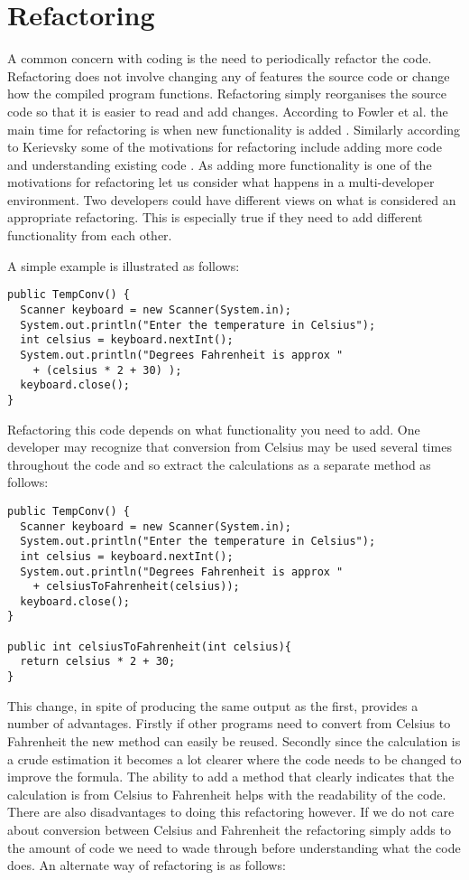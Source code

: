 \section{Refactoring}

A common concern with coding is the need to periodically refactor the code. Refactoring does not involve changing any of features the source code or change how the compiled program functions. Refactoring simply reorganises the source code so that it is easier to read and add changes. According to Fowler et al. the main time for refactoring is when new functionality is added \cite{Fowler1999}. Similarly according to Kerievsky some of the motivations for refactoring include adding more code and understanding existing code \cite{Kerievsky2004}. As adding more functionality is one of the motivations for refactoring let us consider what happens in a multi-developer environment. Two developers could have different views on what is considered an appropriate refactoring. This is especially true if they need to add different functionality from each other. 

A simple example is illustrated as follows:

\begin{lstlisting}
public TempConv() {
  Scanner keyboard = new Scanner(System.in);
  System.out.println("Enter the temperature in Celsius");
  int celsius = keyboard.nextInt();
  System.out.println("Degrees Fahrenheit is approx " 
    + (celsius * 2 + 30) );
  keyboard.close();
}
\end{lstlisting}

Refactoring this code depends on what functionality you need to add. One developer may recognize that conversion from Celsius may be used several times throughout the code and so extract the calculations as a separate method as follows:

\begin{lstlisting}
public TempConv() {
  Scanner keyboard = new Scanner(System.in);
  System.out.println("Enter the temperature in Celsius");
  int celsius = keyboard.nextInt();
  System.out.println("Degrees Fahrenheit is approx " 
    + celsiusToFahrenheit(celsius));
  keyboard.close();
}

public int celsiusToFahrenheit(int celsius){
  return celsius * 2 + 30;
}
\end{lstlisting}

This change, in spite of producing the same output as the first, provides a number of advantages. Firstly if other programs need to convert from Celsius to Fahrenheit the new method can easily be reused. Secondly since the calculation is a crude estimation it becomes a lot clearer where the code needs to be changed to improve the formula. The ability to add a method that clearly indicates that the calculation is from Celsius to Fahrenheit helps with the readability of the code. There are also disadvantages to doing this refactoring however. If we do not care about conversion between Celsius and Fahrenheit the refactoring simply adds to the amount of code we need to wade through before understanding what the code does. An alternate way of refactoring is as follows:

